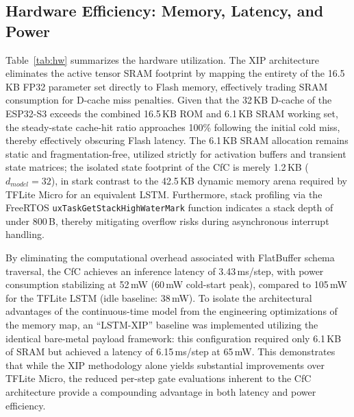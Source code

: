 \documentclass[conference]{IEEEtran}
\begin{document}
\subsection{Hardware Efficiency: Memory, Latency, and Power}
Table~\ref{tab:hw} summarizes the hardware utilization. The XIP architecture eliminates the active tensor SRAM footprint by mapping the entirety of the 16.5\,KB FP32 parameter set directly to Flash memory, effectively trading SRAM consumption for D-cache miss penalties. Given that the 32\,KB D-cache of the ESP32-S3 exceeds the combined 16.5\,KB ROM and 6.1\,KB SRAM working set, the steady-state cache-hit ratio approaches 100\% following the initial cold miss, thereby effectively obscuring Flash latency. The 6.1\,KB SRAM allocation remains static and fragmentation-free, utilized strictly for activation buffers and transient state matrices; the isolated state footprint of the CfC is merely 1.2\,KB ($d_{model}=32$), in stark contrast to the 42.5\,KB dynamic memory arena required by TFLite Micro for an equivalent LSTM. Furthermore, stack profiling via the FreeRTOS \texttt{uxTaskGetStackHighWaterMark} function indicates a stack depth of under 800\,B, thereby mitigating overflow risks during asynchronous interrupt handling.

By eliminating the computational overhead associated with FlatBuffer schema traversal, the CfC achieves an inference latency of 3.43\,ms/step, with power consumption stabilizing at 52\,mW (60\,mW cold-start peak), compared to 105\,mW for the TFLite LSTM (idle baseline: 38\,mW). To isolate the architectural advantages of the continuous-time model from the engineering optimizations of the memory map, an ``LSTM-XIP'' baseline was implemented utilizing the identical bare-metal payload framework: this configuration required only 6.1\,KB of SRAM but achieved a latency of 6.15\,ms/step at 65\,mW. This demonstrates that while the XIP methodology alone yields substantial improvements over TFLite Micro, the reduced per-step gate evaluations inherent to the CfC architecture provide a compounding advantage in both latency and power efficiency.
\end{document}
